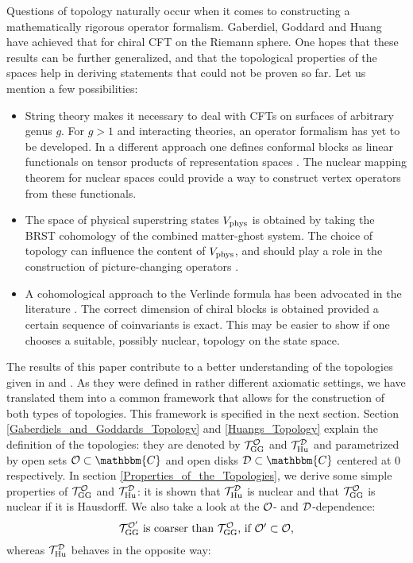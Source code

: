 \documentclass[a4paper,12pt,twoside]{article}
\renewcommand{\c}[1]{{\cal #1}}
\newcommand{\bC}{\mathbbm{C}}
\newcommand{\cT}{{\cal T}}
\renewcommand{\O}{\c{O}}
\newcommand{\D}{\c{D}}
\newcommand{\Hu}{{\rm Hu}}
\newcommand{\GG}{{\rm GG}}
\newcommand{\THud}{\cT_{\Hu}^{\D}}
\newcommand{\TGG}{\cT_{\GG}^{\O}}
\newcommand{\TGGp}{\cT_{\GG}^{{\O}'}}
\begin{document}
Questions of topology
naturally occur when it
comes to constructing a mathematically rigorous operator formalism.
Gaberdiel, Goddard and Huang have achieved that for chiral CFT on
the Riemann sphere. One hopes that these results can be
further generalized, and that the topological properties of the
spaces help in deriving statements that could not be proven so
far. Let us mention a few possibilities:
\begin{itemize}
\item
String theory makes it necessary to deal with CFTs on surfaces of
arbitrary genus $g$. For $g>1$ and interacting theories,
an operator formalism has yet to be developed.
In a different approach one defines conformal blocks as
linear functionals on tensor products of representation spaces \cite{Frenkel}.
The nuclear mapping theorem for nuclear spaces could
provide a way to construct vertex operators from these functionals.
\item
The space of physical superstring states $V_{\rm phys}$ is obtained by
taking the BRST cohomology of the combined matter-ghost system.
The choice of topology can influence
the content of $V_{\rm phys}$, and should
play a role in the construction of picture-changing operators \cite{Berkovits}.
\item
A cohomological approach to the Verlinde formula has been advocated in
the literature \cite{Teleman,Fuchs2}.
The correct dimension of chiral blocks
is obtained provided a certain sequence of coinvariants is exact.
This may be easier to show if one chooses a suitable, possibly nuclear,
topology on the state space.
\end{itemize}
The results of this paper contribute to a
better understanding of the topologies given in
\cite{Gaberdiel} and \cite{Huang}. As they were defined
in rather different axiomatic settings, we have translated
them into a
common framework that allows for the construction of both types of topologies. This
framework is specified in the next section. Section
\ref{Gaberdiels_and_Goddards_Topology} and \ref{Huangs_Topology} explain the definition
of the topologies: they are denoted by $\TGG$ and $\THud$ and parametrized by open sets
$\O\subset\bC$ and open disks $\D\subset\bC$ centered at 0 respectively.
In section \ref{Properties_of_the_Topologies}, we derive some
simple properties of $\TGG$ and $\THud$:
it is shown that $\THud$ is nuclear and that $\TGG$
is nuclear if it is Hausdorff. We also take a look
at the $\O$- and $\D$-dependence:
$$\mbox{$\TGGp$ is coarser than $\TGG$, if $\O'\subset\O$,}$$
whereas $\THud$ behaves in the opposite way:
\end{document}
